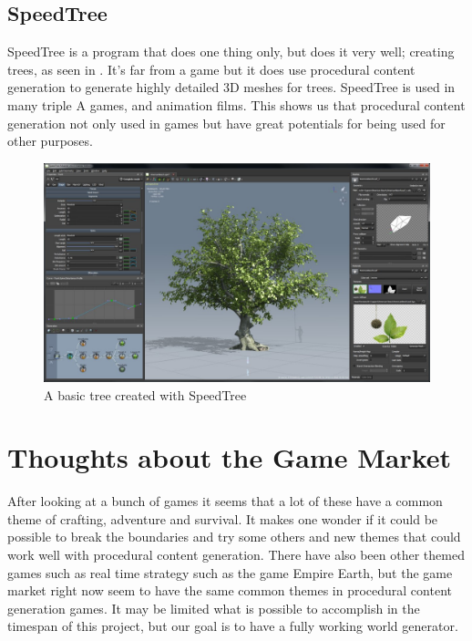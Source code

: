 \subsection{SpeedTree}

SpeedTree\cite{SpeedTree} is a program that does one thing only, but does it very well; creating trees, as seen in . It's far from a game but it does use procedural content generation to generate highly detailed 3D meshes for trees. SpeedTree is used in many triple A games, and animation films. This shows us that procedural content generation not only used in games but have great potentials for being used for other purposes.

\begin{figure}[H]
	\includegraphics[width=0.7\linewidth]{img/SpeedTree}
	\centering
	\caption{A basic tree created with SpeedTree}
	\label{fig:SpeedTree}
\end{figure}


\section{Thoughts about the Game Market}

After looking at a bunch of games it seems that a lot of these have a common theme of crafting, adventure and survival. It makes one wonder if it could be possible to break the boundaries and try some others and new themes that could work well with procedural content generation. There have also been other themed games such as real time strategy such as the game Empire Earth, but the game market right now seem to have the same common themes in procedural content generation games. It may be limited what is possible to accomplish in the timespan of this project, but our goal is to have a fully working world generator.